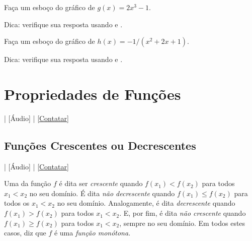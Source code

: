 \begin{exer}
  Faça um esboço do gráfico de $g(x) = 2x^3 - 1$.
\end{exer}
\begin{resp}
  \ifispython
  Dica: verifique sua resposta usando {\python} e {\sympy}.
  \fi
\end{resp}

\begin{exer}
  Faça um esboço do gráfico de $h(x)=-1/(x^2+2x+1)$.
\end{exer}
\begin{resp}
  \ifispython
  Dica: verifique sua resposta usando {\python} e {\sympy}.
  \fi
\end{resp}

\section{Propriedades de Funções}\label{cap_funcao_sec_funprop}

\begin{flushright}
  [Vídeo] | [Áudio] | \href{https://phkonzen.github.io/notas/contato.html}{[Contatar]}
\end{flushright}

\subsection{Funções Crescentes ou Decrescentes}

\begin{flushright}
  [Vídeo] | [Áudio] | \href{https://phkonzen.github.io/notas/contato.html}{[Contatar]}
\end{flushright}

Uma da função $f$ é dita ser \emph{crescente} quando $f(x_1)<f(x_2)$ para todos $x_1<x_2$ no seu domínio. É dita \emph{não decrescente} quando $f(x_1)\leq f(x_2)$ para todos os $x_1<x_2$ no seu domínio. Analogamente, é dita \emph{decrescente} quando $f(x_1)>f(x_2)$ para todos $x_1<x_2$. E, por fim, é dita \emph{não crescente} quando $f(x_1)\geq f(x_2)$ para todos $x_1<x_2$, sempre no seu domínio. Em todos estes casos, diz que $f$ é uma \emph{função monótona}.

